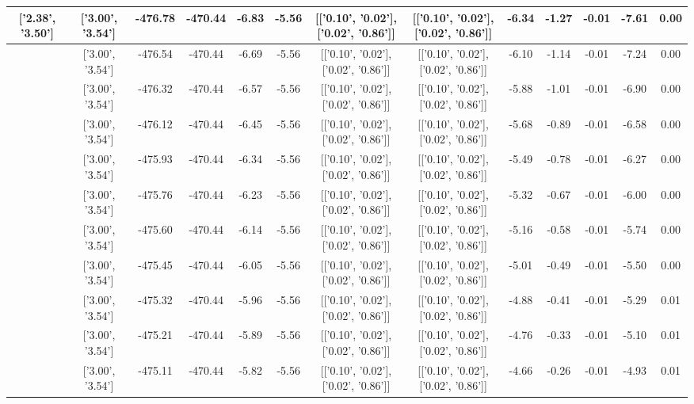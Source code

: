 \begin{table}[htbp]
\begin{adjustbox}{angle=90}
\begin{tabular}{|c|c|c|c|c|c|c|c|c|c|c|c|c|}
 ['2.38', '3.50'] & ['3.00', '3.54'] & -476.78 & -470.44 & -6.83 & -5.56 & [['0.10', '0.02'], ['0.02', '0.86']] & [['0.10', '0.02'], ['0.02', '0.86']] & -6.34 & -1.27 & -0.01 & -7.61 & 0.00\\ \hline
 ['2.42', '3.50'] & ['3.00', '3.54'] & -476.54 & -470.44 & -6.69 & -5.56 & [['0.10', '0.02'], ['0.02', '0.86']] & [['0.10', '0.02'], ['0.02', '0.86']] & -6.10 & -1.14 & -0.01 & -7.24 & 0.00\\ \hline
 ['2.45', '3.50'] & ['3.00', '3.54'] & -476.32 & -470.44 & -6.57 & -5.56 & [['0.10', '0.02'], ['0.02', '0.86']] & [['0.10', '0.02'], ['0.02', '0.86']] & -5.88 & -1.01 & -0.01 & -6.90 & 0.00\\ \hline
 ['2.49', '3.51'] & ['3.00', '3.54'] & -476.12 & -470.44 & -6.45 & -5.56 & [['0.10', '0.02'], ['0.02', '0.86']] & [['0.10', '0.02'], ['0.02', '0.86']] & -5.68 & -0.89 & -0.01 & -6.58 & 0.00\\ \hline
 ['2.53', '3.51'] & ['3.00', '3.54'] & -475.93 & -470.44 & -6.34 & -5.56 & [['0.10', '0.02'], ['0.02', '0.86']] & [['0.10', '0.02'], ['0.02', '0.86']] & -5.49 & -0.78 & -0.01 & -6.27 & 0.00\\ \hline
 ['2.57', '3.51'] & ['3.00', '3.54'] & -475.76 & -470.44 & -6.23 & -5.56 & [['0.10', '0.02'], ['0.02', '0.86']] & [['0.10', '0.02'], ['0.02', '0.86']] & -5.32 & -0.67 & -0.01 & -6.00 & 0.00\\ \hline
 ['2.61', '3.51'] & ['3.00', '3.54'] & -475.60 & -470.44 & -6.14 & -5.56 & [['0.10', '0.02'], ['0.02', '0.86']] & [['0.10', '0.02'], ['0.02', '0.86']] & -5.16 & -0.58 & -0.01 & -5.74 & 0.00\\ \hline
 ['2.64', '3.52'] & ['3.00', '3.54'] & -475.45 & -470.44 & -6.05 & -5.56 & [['0.10', '0.02'], ['0.02', '0.86']] & [['0.10', '0.02'], ['0.02', '0.86']] & -5.01 & -0.49 & -0.01 & -5.50 & 0.00\\ \hline
 ['2.68', '3.52'] & ['3.00', '3.54'] & -475.32 & -470.44 & -5.96 & -5.56 & [['0.10', '0.02'], ['0.02', '0.86']] & [['0.10', '0.02'], ['0.02', '0.86']] & -4.88 & -0.41 & -0.01 & -5.29 & 0.01\\ \hline
 ['2.72', '3.52'] & ['3.00', '3.54'] & -475.21 & -470.44 & -5.89 & -5.56 & [['0.10', '0.02'], ['0.02', '0.86']] & [['0.10', '0.02'], ['0.02', '0.86']] & -4.76 & -0.33 & -0.01 & -5.10 & 0.01\\ \hline
 ['2.76', '3.52'] & ['3.00', '3.54'] & -475.11 & -470.44 & -5.82 & -5.56 & [['0.10', '0.02'], ['0.02', '0.86']] & [['0.10', '0.02'], ['0.02', '0.86']] & -4.66 & -0.26 & -0.01 & -4.93 & 0.01\\ \hline

\end{tabular}
\end{adjustbox}
\end{table}
